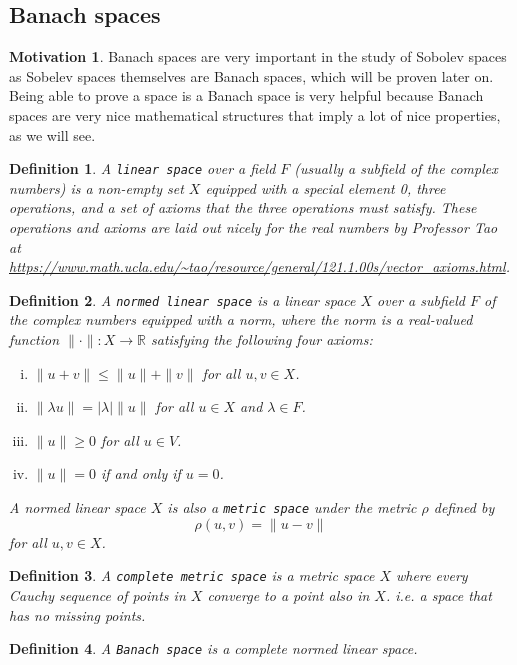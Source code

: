 \documentclass[11pt]{article}
\newtheorem{definition}{Definition}
\theoremstyle{definition}
\newtheorem*{motivation}{Motivation}
\begin{document}
\newpage

\subsection{Banach spaces}
\begin{motivation}
Banach spaces are very important in the study of Sobolev spaces as Sobelev spaces themselves are Banach spaces, which will be proven later on.
Being able to prove a space is a Banach space is very helpful because Banach spaces are very nice mathematical structures that imply
a lot of nice properties, as we will see.
\end{motivation}
\begin{definition}
	A \texttt{linear space} over a field $F$ (usually a subfield of the complex numbers) is a non-empty set $X$ equipped with a special element 0, 
	three operations, and a set of
	axioms that the three operations must satisfy. These operations and axioms are laid out nicely for the real numbers by Professor Tao at
	\url{https://www.math.ucla.edu/~tao/resource/general/121.1.00s/vector_axioms.html}.
\end{definition}
\begin{definition}
	A \texttt{normed linear space} is a linear space $X$ over a subfield $F$ of the complex numbers equipped with a norm,
	where the norm is a real-valued function $\|\cdot\| : X \rightarrow \mathbb{R}$ satisfying the following four axioms:
	\begin{enumerate}[(i)]
		\item $\|u+v\| \leq \|u\|+\|v\|$ for all $u,v \in X$.
		\item $\|\lambda u\| = |\lambda|\|u\|$ for all $u \in X$ and $\lambda \in F$.
		\item $\|u\| \geq 0$ for all $u \in V$.
		\item $\|u\| = 0$ if and only if $u=0$.
	\end{enumerate}
	A normed linear space $X$ is also a \texttt{metric space} under the metric $\rho$ defined by
	\[\rho(u,v) = \|u-v\|\]
	for all $u,v \in X$.
\end{definition}
\begin{definition}
	A \texttt{complete metric space} is a metric space $X$ where every Cauchy sequence of points in $X$ converge to a point also in $X$.
	i.e. a space that has no missing points.
\end{definition}
\begin{definition}
	A \texttt{Banach space} is a complete normed linear space.
\end{definition}
\end{document}
